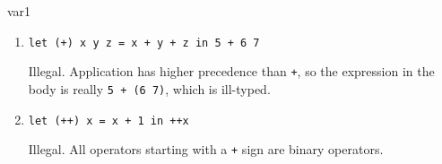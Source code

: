 \begin{exercise}{var1}
\begin{enumerate}
\item \lstinline!let (+) x y z = x + y + z in 5 + 6 7!

\begin{answer}\ifanswers
Illegal.  Application has higher precedence
  than \hbox{\lstinline/+/}, so the expression in the body is
  really \hbox{\lstinline/5 + (6 7)/}, which is ill-typed.
\fi\end{answer}

\item \lstinline!let (++) x = x + 1 in ++x!

\begin{answer}\ifanswers
Illegal.  All operators starting with a \hbox{\lstinline/+/} sign are binary operators.
\fi\end{answer}

\end{enumerate}
\end{exercise}

